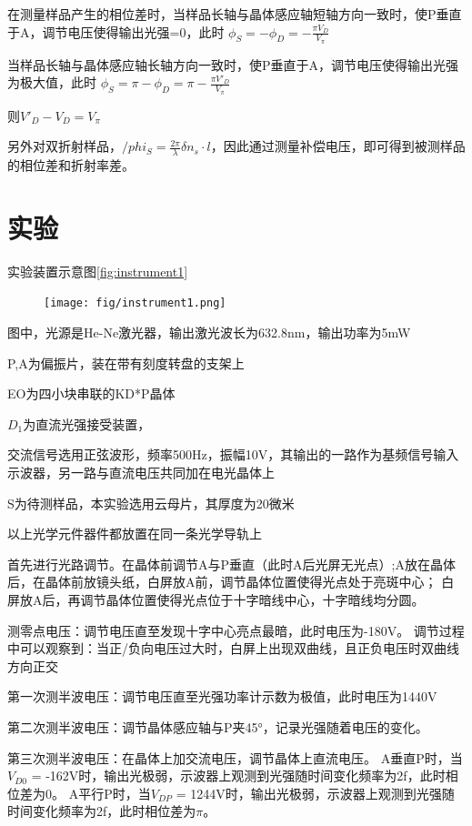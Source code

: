 \documentclass[font=default]{mpltx}
\begin{document}
在测量样品产生的相位差时，当样品长轴与晶体感应轴短轴方向一致时，使P垂直于A，调节电压使得输出光强=0，此时
$\phi_S = - \phi_D = - \frac{\pi V_D}{V_\pi}$

当样品长轴与晶体感应轴长轴方向一致时，使P垂直于A，调节电压使得输出光强为极大值，此时
$\phi_S = \pi - \phi_D = \pi - \frac{\pi {V'}_D}{V_\pi}$

则${V'}_D - V_D = V_\pi$

另外对双折射样品，$/phi_S = \frac{2\pi}{\lambda} \delta n_s \cdot l$，因此通过测量补偿电压，即可得到被测样品的相位差和折射率差。

\section{实验}
实验装置示意图\autoref{fig:instrument1}

\begin{figure}
  \centering
  \texttt{[image: fig/instrument1.png]}
  \label{fig:instrument1}
\end{figure}

图中，光源是He-Ne激光器，输出激光波长为632.8nm，输出功率为5mW

P,A为偏振片，装在带有刻度转盘的支架上

EO为四小块串联的KD*P晶体 

$D_1$为直流光强接受装置，

交流信号选用正弦波形，频率500Hz，振幅10V，其输出的一路作为基频信号输入示波器，另一路与直流电压共同加在电光晶体上

S为待测样品，本实验选用云母片，其厚度为20微米

以上光学元件器件都放置在同一条光学导轨上

首先进行光路调节。在晶体前调节A与P垂直（此时A后光屏无光点）;A放在晶体后，在晶体前放镜头纸，白屏放A前，调节晶体位置使得光点处于亮斑中心；
白屏放A后，再调节晶体位置使得光点位于十字暗线中心，十字暗线均分圆。

测零点电压：调节电压直至发现十字中心亮点最暗，此时电压为-180V。
调节过程中可以观察到：当正/负向电压过大时，白屏上出现双曲线，且正负电压时双曲线方向正交

第一次测半波电压：调节电压直至光强功率计示数为极值，此时电压为1440V

第二次测半波电压：调节晶体感应轴与P夹45°，记录光强随着电压的变化。

第三次测半波电压：在晶体上加交流电压，调节晶体上直流电压。
A垂直P时，当$V_{D0}$ = -162V时，输出光极弱，示波器上观测到光强随时间变化频率为2f，此时相位差为0。
A平行P时，当$V_{DP}$ = 1244V时，输出光极弱，示波器上观测到光强随时间变化频率为2f，此时相位差为$\pi$。
\end{document}
